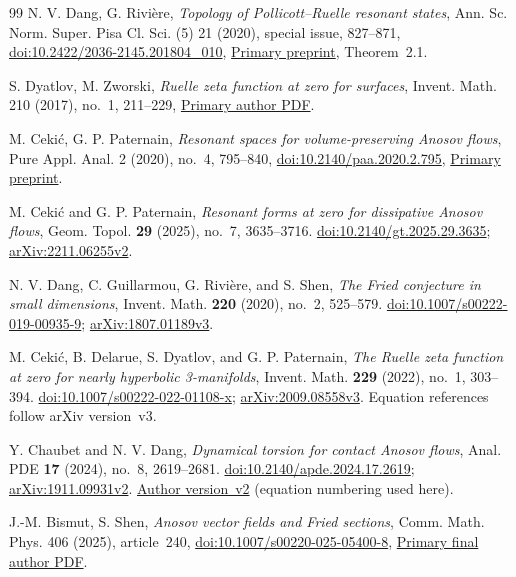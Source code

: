 \documentclass[11pt,letterpaper,reqno]{amsart}
\theoremstyle{remark}
\begin{document}
\begin{thebibliography}{99}
 N. V. Dang, G. Rivi\`ere,
\emph{Topology of Pollicott--Ruelle resonant states},
Ann. Sc. Norm. Super. Pisa Cl. Sci. (5) 21 (2020), special issue,
827--871,
\href{https://doi.org/10.2422/2036-2145.201804_010}{doi:10.2422/2036-2145.201804\_010},
\href{https://arxiv.org/abs/1703.08037}{Primary preprint}, Theorem~2.1.

 S. Dyatlov, M. Zworski,
\emph{Ruelle zeta function at zero for surfaces},
Invent. Math. 210 (2017), no.~1, 211--229,
\href{https://math.berkeley.edu/~zworski/zazi.pdf}{Primary author PDF}.

 M. Ceki\'c, G. P. Paternain,
\emph{Resonant spaces for volume-preserving Anosov flows},
Pure Appl. Anal. 2 (2020), no.~4, 795--840,
\href{https://doi.org/10.2140/paa.2020.2.795}{doi:10.2140/paa.2020.2.795},
\href{https://arxiv.org/abs/1911.03881}{Primary preprint}.

 M. Ceki\'c and G. P. Paternain,
\emph{Resonant forms at zero for dissipative Anosov flows},
Geom. Topol. \textbf{29} (2025), no.~7, 3635--3716.
\href{https://doi.org/10.2140/gt.2025.29.3635}{doi:10.2140/gt.2025.29.3635};
\href{https://arxiv.org/abs/2211.06255v2}{arXiv:2211.06255v2}.

 N. V. Dang, C. Guillarmou, G. Rivi\`ere, and S. Shen,
\emph{The Fried conjecture in small dimensions},
Invent. Math. \textbf{220} (2020), no.~2, 525--579.
\href{https://doi.org/10.1007/s00222-019-00935-9}{doi:10.1007/s00222-019-00935-9};
\href{https://arxiv.org/abs/1807.01189v3}{arXiv:1807.01189v3}.

 M. Ceki\'c, B. Delarue, S. Dyatlov, and G. P. Paternain,
\emph{The Ruelle zeta function at zero for nearly hyperbolic 3-manifolds},
Invent. Math. \textbf{229} (2022), no.~1, 303--394.
\href{https://doi.org/10.1007/s00222-022-01108-x}{doi:10.1007/s00222-022-01108-x};
\href{https://arxiv.org/abs/2009.08558v3}{arXiv:2009.08558v3}.
Equation references follow arXiv version~v3.

 Y. Chaubet and N. V. Dang,
\emph{Dynamical torsion for contact Anosov flows},
Anal. PDE \textbf{17} (2024), no.~8, 2619--2681.
\href{https://doi.org/10.2140/apde.2024.17.2619}{doi:10.2140/apde.2024.17.2619};
\href{https://arxiv.org/abs/1911.09931v2}{arXiv:1911.09931v2}.
\href{https://arxiv.org/html/1911.09931v2}{Author version~v2}
(equation numbering used here).

 J.-M. Bismut, S. Shen,
\emph{Anosov vector fields and Fried sections},
Comm. Math. Phys. 406 (2025), article~240,
\href{https://doi.org/10.1007/s00220-025-05400-8}{doi:10.1007/s00220-025-05400-8},
\href{https://webusers.imj-prg.fr/~shu.shen/publication/cmp_BismutShen25.pdf}
{Primary final author PDF}.


\end{thebibliography}
\end{document}
